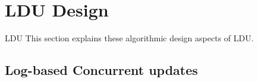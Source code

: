 \section{LDU Design}


%

LDU 
This section explains these algorithmic design aspects of LDU.

\subsection{Log-based Concurrent updates}




%

